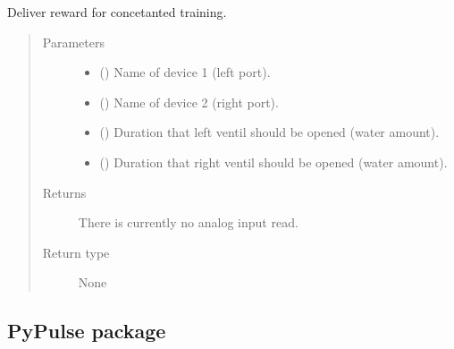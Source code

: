\documentclass[letterpaper,10pt,english]{sphinxmanual}
\begin{document}
\begin{fulllineitems}
\label{\detokenize{NoSeMazeController/HelperFunctions:HelperFunctions.Reward.deliver_reward_static_two}}
\pysigstartsignatures
{}
\pysigstopsignatures
\sphinxAtStartPar
Deliver reward for concetanted training.
\begin{quote}\begin{description}
\item[{Parameters}] \leavevmode\begin{itemize}
\item {} 
\sphinxAtStartPar
{} () \textendash{} Name of device 1 (left port).

\item {} 
\sphinxAtStartPar
{} () \textendash{} Name of device 2 (right port).

\item {} 
\sphinxAtStartPar
{} () \textendash{} Duration that left ventil should be opened (water amount).

\item {} 
\sphinxAtStartPar
{} () \textendash{} Duration that right ventil should be opened (water amount).

\end{itemize}

\item[{Returns}] \leavevmode
\sphinxAtStartPar
{} \textendash{} There is currently no analog input read.

\item[{Return type}] \leavevmode
\sphinxAtStartPar
None

\end{description}\end{quote}

\end{fulllineitems}


\sphinxstepscope


\subsection{PyPulse package}
\label{\detokenize{NoSeMazeController/PyPulse:pypulse-package}}\label{\detokenize{NoSeMazeController/PyPulse::doc}}
\end{document}
